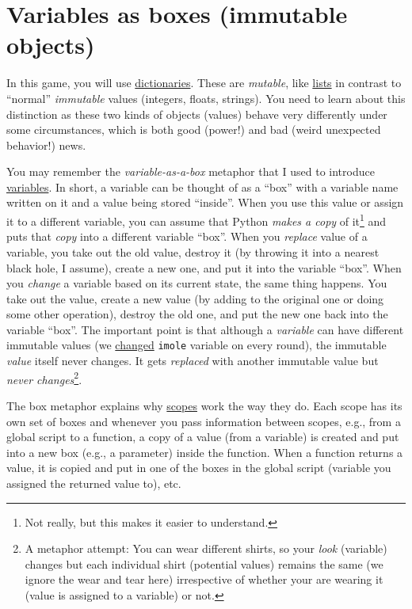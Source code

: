 \documentclass[
]{book}
\begin{document}
\hypertarget{variables-as-boxes-immutable-objects}{%
\section{Variables as boxes (immutable objects)}\label{variables-as-boxes-immutable-objects}}

In this game, you will use \protect\hyperlink{dictionaries}{dictionaries}. These are \emph{mutable}, like \protect\hyperlink{lists}{lists} in contrast to ``normal'' \emph{immutable} values (integers, floats, strings). You need to learn about this distinction as these two kinds of objects (values) behave very differently under some circumstances, which is both good (power!) and bad (weird unexpected behavior!) news.

You may remember the \emph{variable-as-a-box} metaphor that I used to introduce \protect\hyperlink{variables}{variables}. In short, a variable can be thought of as a ``box'' with a variable name written on it and a value being stored ``inside''. When you use this value or assign it to a different variable, you can assume that Python \emph{makes a copy} of it\footnote{Not really, but this makes it easier to understand.} and puts that \emph{copy} into a different variable ``box''. When you \emph{replace} value of a variable, you take out the old value, destroy it (by throwing it into a nearest black hole, I assume), create a new one, and put it into the variable ``box''. When you \emph{change} a variable based on its current state, the same thing happens. You take out the value, create a new value (by adding to the original one or doing some other operation), destroy the old one, and put the new one back into the variable ``box''. The important point is that although a \emph{variable} can have different immutable values (we \protect\hyperlink{random-mole}{changed} \texttt{imole} variable on every round), the immutable \emph{value} itself never changes. It gets \emph{replaced} with another immutable value but \emph{never changes}\footnote{A metaphor attempt: You can wear different shirts, so your \emph{look} (variable) changes but each individual shirt (potential values) remains the same (we ignore the wear and tear here) irrespective of whether your are wearing it (value is assigned to a variable) or not.}.

The box metaphor explains why \protect\hyperlink{scopes-for-immutable-values}{scopes} work the way they do. Each scope has its own set of boxes and whenever you pass information between scopes, e.g., from a global script to a function, a copy of a value (from a variable) is created and put into a new box (e.g., a parameter) inside the function. When a function returns a value, it is copied and put in one of the boxes in the global script (variable you assigned the returned value to), etc.
\end{document}
